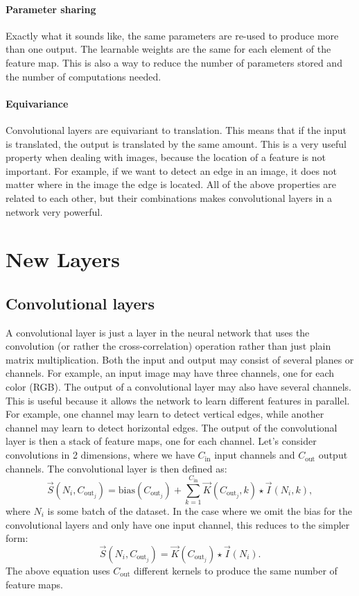         \paragraph{Parameter sharing}
            Exactly what it sounds like, the same parameters are re-used to produce more than one output. The learnable weights are the same for each element of the feature map. This is also a way to reduce the number of parameters stored and the number of computations needed.

        \paragraph{Equivariance}
            Convolutional layers are equivariant to translation. This means that if the input is translated, the output is translated by the same amount. This is a very useful property when dealing with images, because the location of a feature is not important. For example, if we want to detect an edge in an image, it does not matter where in the image the edge is located.
        All of the above properties are related to each other, but their combinations makes convolutional layers in a network very powerful.
\section{New Layers}
    \subsection{Convolutional layers}
        A convolutional layer is just a layer in the neural network that uses the convolution (or rather the cross-correlation) operation rather than just plain matrix multiplication. Both the input and output may consist of several planes or channels. For example, an input image may have three channels, one for each color (RGB). The output of a convolutional layer may also have several channels. This is useful because it allows the network to learn different features in parallel. For example, one channel may learn to detect vertical edges, while another channel may learn to detect horizontal edges. The output of the convolutional layer is then a stack of feature maps, one for each channel. Let's consider convolutions in 2 dimensions, where we have $C_\mathrm{in}$ input channels and $C_\mathrm{out}$ output channels. The convolutional layer is then defined as:
        \begin{equation}
            \vec{S}(N_i, C_{\mathrm{out}_j}) = \mathrm{bias}(C_{\mathrm{out}_j}) + \sum_{k=1}^{C_\mathrm{in}} \vec{K}(C_{\mathrm{out}_j}, k) \star \vec{I}(N_i, k),
        \end{equation}
        where $N_i$ is some batch of the dataset. In the case where we omit the bias for the convolutional layers and only have one input channel, this reduces to the simpler form: 
        \begin{equation}
            \vec{S}(N_i, C_{\mathrm{out}_j}) = \vec{K}(C_{\mathrm{out}_j}) \star \vec{I}(N_i).
        \end{equation} 
        The above equation uses $C_{\mathrm{out}}$ different kernels to produce the same number of feature maps. 

